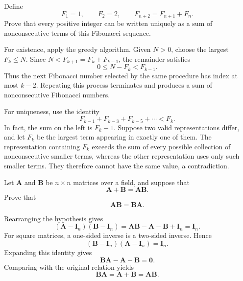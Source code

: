     \begin{expectedproblem}
        Define
        \[
            F_1=1,
            \qquad
            F_2=2,
            \qquad
            F_{n+2}=F_{n+1}+F_n.
        \]
        Prove that every positive integer can be written uniquely as a sum of
        nonconsecutive terms of this Fibonacci sequence.
    \end{expectedproblem}

    \begin{solution}
        For existence, apply the greedy algorithm. Given $N>0$, choose the
        largest $F_k\leq N$. Since $N<F_{k+1}=F_k+F_{k-1}$, the remainder
        satisfies
        \[
            0\leq N-F_k<F_{k-1}.
        \]
        Thus the next Fibonacci number selected by the same procedure has index
        at most $k-2$. Repeating this process terminates and produces a sum of
        nonconsecutive Fibonacci numbers.

        For uniqueness, use the identity
        \[
            F_{k-1}+F_{k-3}+F_{k-5}+\cdots<F_k.
        \]
        In fact, the sum on the left is $F_k-1$. Suppose two valid
        representations differ, and let $F_k$ be the largest term appearing in
        exactly one of them. The representation containing $F_k$ exceeds the
        sum of every possible collection of nonconsecutive smaller terms,
        whereas the other representation uses only such smaller terms. They
        therefore cannot have the same value, a contradiction.
    \end{solution}

    \begin{expectedproblem}[1986 Putnam]
        Let $\mathbf{A}$ and $\mathbf{B}$ be $n\times n$ matrices
        over a field, and suppose that
        \[
            \mathbf{A}+\mathbf{B}=\mathbf{A}\mathbf{B}.
        \]
        Prove that
        \[
            \mathbf{A}\mathbf{B}=\mathbf{B}\mathbf{A}.
        \]
    \end{expectedproblem}

    \begin{solution}
        Rearranging the hypothesis gives
        \[
            (\mathbf{A}-\mathbf{I}_n)(\mathbf{B}-\mathbf{I}_n)
            =
            \mathbf{A}\mathbf{B}-\mathbf{A}-\mathbf{B}+\mathbf{I}_n
            =
            \mathbf{I}_n.
        \]
        For square matrices, a one-sided inverse is a two-sided inverse. Hence
        \[
            (\mathbf{B}-\mathbf{I}_n)(\mathbf{A}-\mathbf{I}_n)=\mathbf{I}_n.
        \]
        Expanding this identity gives
        \[
            \mathbf{B}\mathbf{A}-\mathbf{A}-\mathbf{B}=\mathbf{0}.
        \]
        Comparing with the original relation yields
        \[
            \mathbf{B}\mathbf{A}
            =
            \mathbf{A}+\mathbf{B}
            =
            \mathbf{A}\mathbf{B}.
        \]
    \end{solution}

